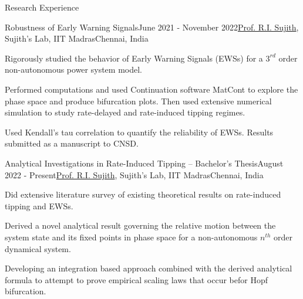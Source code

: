 \documentclass{resume} %
\begin{document}
\begin{rSection}{Research Experience}
\begin{rSubsection}{Robustness of Early Warning Signals}{June 2021 - November 2022}{\href{http://www.ae.iitm.ac.in/~sujith/}{Prof. R.I. Sujith}, Sujith's Lab, IIT Madras}{Chennai, India}
\item Rigorously studied the behavior of Early Warning Signals (EWSs) for a $3^{rd}$ order non-autonomous power system model.
\item Performed computations and used Continuation software MatCont to explore the phase space and produce bifurcation plots. Then used extensive numerical simulation to study rate-delayed and rate-induced tipping regimes.
\item Used Kendall's tau correlation to quantify the reliability of EWSs. Results submitted as a manuscript to CNSD.
\end{rSubsection}

\begin{rSubsection}{Analytical Investigations in Rate-Induced Tipping -- Bachelor's Thesis}{August 2022 - Present}{\href{http://www.ae.iitm.ac.in/~sujith/}{Prof. R.I. Sujith}, Sujith's Lab, IIT Madras}{Chennai, India}
\item Did extensive literature survey of existing theoretical results on rate-induced tipping and EWSs.
\item Derived a novel analytical result governing the relative motion between the system state and its fixed points in phase space for a non-autonomous $n^{th}$ order dynamical system.
\item Developing an integration based approach combined with the derived analytical formula to attempt to prove empirical scaling laws that occur befor Hopf bifurcation.
\end{rSubsection}

\end{rSection}

\vspace{1em}



\end{document}
